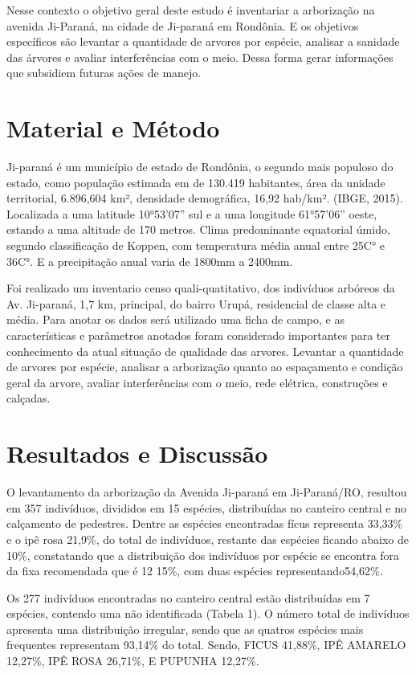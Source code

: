\documentclass[article,12pt,onesidea,4paper,english,brazil]{abntex2}
\begin{document}
	Nesse contexto o objetivo geral deste estudo é inventariar a arborização na avenida Ji-Paraná, na cidade de Ji-paraná em Rondônia. E os objetivos específicos são levantar a quantidade de arvores por espécie, analisar a sanidade das árvores e avaliar interferências com o meio. Dessa forma gerar informações que subsidiem futuras ações de manejo.
	\section*{Material e Método}
	Ji-paraná é um município de estado de Rondônia, o segundo mais populoso do estado, como população estimada em de 130.419 habitantes, área da unidade territorial, 6.896,604 km², densidade demográfica, 16,92 hab/km². (IBGE, 2015).
	Localizada a uma latitude 10°53’07” sul e a uma longitude 61°57’06” oeste, estando a uma altitude de 170 metros. Clima predominante equatorial úmido, segundo classificação de Koppen, com temperatura média anual entre 25C° e 36C°. E a precipitação anual varia de 1800mm a 2400mm.
	
	Foi realizado um inventario censo quali-quatitativo, dos indivíduos arbóreos da Av. Ji-paraná, 1,7 km, principal, do bairro Urupá, residencial de classe alta e média. Para anotar os dados será utilizado uma ficha de campo, e as características e parâmetros anotados foram considerado importantes para ter conhecimento da atual situação de qualidade das arvores. Levantar a quantidade de arvores por espécie, analisar a arborização quanto ao espaçamento e condição geral da arvore, avaliar interferências com o meio, rede elétrica, construções e calçadas.
	
	\section*{Resultados e Discussão}
	
O levantamento da arborização da Avenida Ji-paraná em Ji-Paraná/RO, resultou em 357 indivíduos, divididos em 15 espécies, distribuídas no canteiro central e no calçamento de pedestres. Dentre as espécies encontradas fícus representa 33,33\% e o ipê rosa 21,9\%, do total de indivíduos, restante das espécies ficando abaixo de 10\%, constatando que a distribuição dos indivíduos por espécie se encontra fora da fixa recomendada que é 12 15\%, com duas espécies  representando54,62\%.

Os 277 indivíduos encontradas no canteiro central estão distribuídas em 7 espécies, contendo uma não identificada (Tabela 1). O número total de indivíduos apresenta uma distribuição irregular, sendo que as quatros espécies mais frequentes representam 93,14\% do total. Sendo, FICUS 41,88\%, IPÊ AMARELO 12,27\%, IPÊ ROSA 26,71\%, E PUPUNHA 12,27\%.
\end{document}
